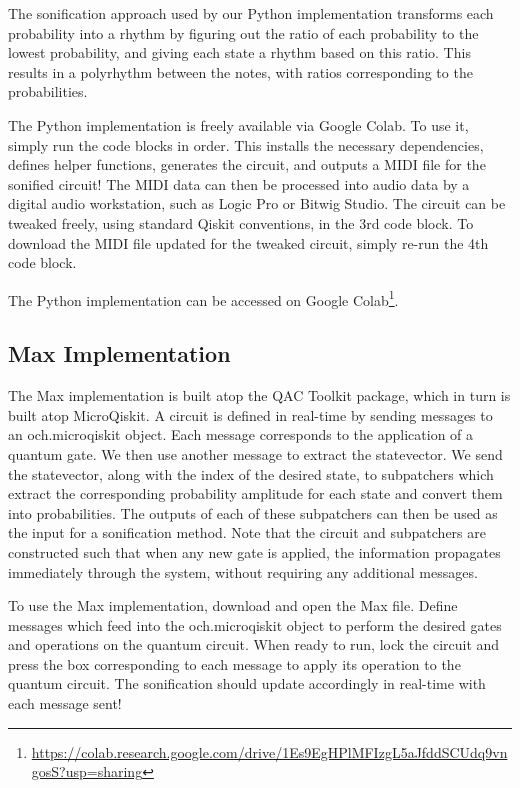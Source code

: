 \documentclass[10pt,twocolumn]{article}
\begin{document}
The sonification approach used by our Python implementation transforms each probability into a rhythm by figuring out the ratio of each probability to the lowest probability, and giving each state a rhythm based on this ratio. This results in a polyrhythm between the notes, with ratios corresponding to the probabilities. 

The Python implementation is freely available via Google Colab\cite{googlecolab}. To use it, simply run the code blocks in order. This installs the necessary dependencies, defines helper functions, generates the circuit, and outputs a MIDI file for the sonified circuit! The MIDI data can then be processed into audio data by a digital audio workstation, such as Logic Pro or Bitwig Studio. The circuit can be tweaked freely, using standard Qiskit conventions, in the 3rd code block. To download the MIDI file updated for the tweaked circuit, simply re-run the 4th code block.

The Python implementation can be accessed on Google Colab\footnote{\url{https://colab.research.google.com/drive/1Es9EgHPlMFIzgL5aJfddSCUdq9vngosS?usp=sharing}}.

\subsection{Max Implementation}

The Max implementation is built atop the QAC Toolkit\cite{Hamido_2022} package, which in turn is built atop MicroQiskit\cite{microqiskit}. A circuit is defined in real-time by sending messages to an och.microqiskit object. Each message corresponds to the application of a quantum gate. We then use another message to extract the statevector. We send the statevector, along with the index of the desired state, to subpatchers which extract the corresponding probability amplitude for each state and convert them into probabilities. The outputs of each of these subpatchers can then be used as the input for a sonification method. Note that the circuit and subpatchers are constructed such that when any new gate is applied, the information propagates immediately through the system, without requiring any additional messages.

To use the Max implementation, download and open the Max file. Define messages which feed into the och.microqiskit object to perform the desired gates and operations on the quantum circuit. When ready to run, lock the circuit and press the box corresponding to each message to apply its operation to the quantum circuit. The sonification should update accordingly in real-time with each message sent!
\end{document}
